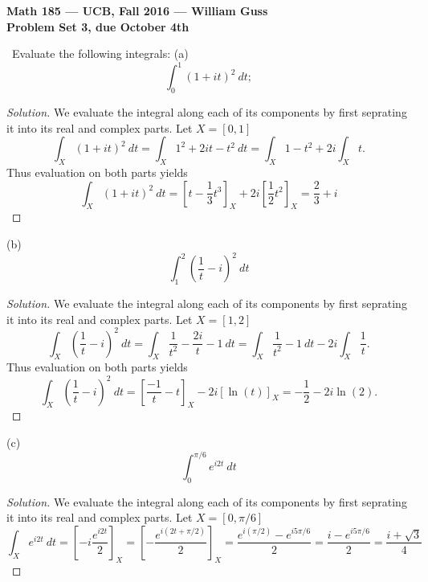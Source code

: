 \documentclass[11pt]{amsart}
\theoremstyle{definition}
\numberwithin{theorem}{section}
\numberwithin{definition}{section}
\numberwithin{equation}{section}
\newenvironment{solution}
  {\begin{proof}[Solution]}
  {\end{proof}}
\begin{document}
\begin{center}{\bf Math 185 --- UCB, Fall 2016 --- William Guss}
\\
{\bf Problem Set 3, due October 4th}
\end{center}

\medskip {}\ Evaluate the following integrals:
\newline \noindent (a) $$ \int_0^1 (1 + it)^2\ dt;$$ 
	\begin{solution}
	We evaluate the integral along each of its components by first seprating it into its real
	and complex parts. Let $X = [0,1]$
	\begin{equation*}
		\int_X (1 + it)^2\ dt = \int_X 1^2 + 2it -t^2\ dt = \int_X 1 -t^2 + 2i\int_X t.
	\end{equation*}
	Thus evaluation on both parts yields
	\begin{equation*}
		\int_X (1 + it)^2\ dt = \left[t -\frac{1}{3}t^3\right]_X + 2i\left[\frac{1}{2}t^2\right]_X = \frac{2}{3} + i
	\end{equation*}
	\end{solution}
 \noindent (b) $$\int_1^2 \left(\frac{1}{t} -i\right)^2\ dt$$
	 \begin{solution}
	 We evaluate the integral along each of its components by first seprating it into its real
	and complex parts. Let $X = [1,2]$
	\begin{equation*}
		\int_X \left(\frac{1}{t}-i\right)^2\ dt = \int_X \frac{1}{t^2} -\frac{2i}{t} -1\ dt = \int_X \frac{1}{t^2} -1\ dt -2i \int_X \frac{1}{t}.
	\end{equation*}
	Thus evaluation on both parts yields
	\begin{equation*}
		\int_X \left(\frac{1}{t}-i\right)^2\ dt = \left[\frac{-1}{t} -t\right]_X - 2i\left[\ln(t)\right]_X = -\frac{1}{2} - 2i \ln(2).
	\end{equation*}
	 \end{solution}

 \noindent (c) $$\int_0^{\pi/6} e^{i2t}\ dt$$
	\begin{solution}
	We evaluate the integral along each of its components by first seprating it into its real
	and complex parts. Let $X = [0,\pi/6]$
	\begin{equation*}
		\int_X e^{i2t}\ dt = \left[-i\frac{e^{i2t}}{2}\right]_X = \left[-\frac{e^{i(2t+\pi/2)}}{2}\right]_X =
		\frac{e^{i(\pi/2)}- e^{i 5\pi/6}}{2} = \frac{i - e^{i 5\pi/6}}	{2} = \frac{i  + \sqrt{3}}{4}
	\end{equation*}
	\end{solution}
\end{document}
